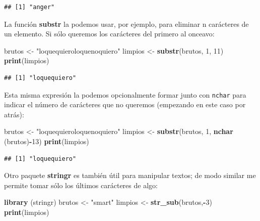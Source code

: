 \documentclass[]{book}
\newenvironment{Shaded}{\begin{snugshade}}{\end{snugshade}}
\newcommand{\DecValTok}[1]{\textcolor[rgb]{0.00,0.00,0.81}{#1}}
\newcommand{\KeywordTok}[1]{\textcolor[rgb]{0.13,0.29,0.53}{\textbf{#1}}}
\newcommand{\NormalTok}[1]{#1}
\newcommand{\OperatorTok}[1]{\textcolor[rgb]{0.81,0.36,0.00}{\textbf{#1}}}
\newcommand{\StringTok}[1]{\textcolor[rgb]{0.31,0.60,0.02}{#1}}
\theoremstyle{definition}
\theoremstyle{definition}
\theoremstyle{definition}
\theoremstyle{remark}
\begin{document}
\begin{verbatim}
## [1] "anger"
\end{verbatim}

La función \textbf{substr} la podemos usar, por ejemplo, para eliminar n
carácteres de un elemento. Si sólo queremos los carácteres del primero
al onceavo:

\begin{Shaded}
\begin{Highlighting}[]
\NormalTok{brutos <-}\StringTok{ "loquequieroloquenoquiero"}
\NormalTok{limpios <-}\StringTok{ }\KeywordTok{substr}\NormalTok{(brutos, }\DecValTok{1}\NormalTok{, }\DecValTok{11}\NormalTok{)}
\KeywordTok{print}\NormalTok{(limpios)}
\end{Highlighting}
\end{Shaded}

\begin{verbatim}
## [1] "loquequiero"
\end{verbatim}

Esta misma expresión la podemos opcionalmente formar junto con
\texttt{nchar} para indicar el número de carácteres que no queremos
(empezando en este caso por atrás):

\begin{Shaded}
\begin{Highlighting}[]
\NormalTok{brutos <-}\StringTok{ "loquequieroloquenoquiero"}
\NormalTok{limpios <-}\StringTok{ }\KeywordTok{substr}\NormalTok{(brutos, }\DecValTok{1}\NormalTok{, }\KeywordTok{nchar}\NormalTok{ (brutos)}\OperatorTok{-}\DecValTok{13}\NormalTok{)}
\KeywordTok{print}\NormalTok{(limpios)}
\end{Highlighting}
\end{Shaded}

\begin{verbatim}
## [1] "loquequiero"
\end{verbatim}

Otro paquete \textbf{stringr} \citep{R-stringr} es también útil para
manipular textos; de modo similar me permite tomar sólo los últimos
carácteres de algo:

\begin{Shaded}
\begin{Highlighting}[]
\KeywordTok{library}\NormalTok{ (stringr)}
\NormalTok{brutos <-}\StringTok{ "smart"}
\NormalTok{limpios <-}\StringTok{ }\KeywordTok{str_sub}\NormalTok{(brutos,}\OperatorTok{-}\DecValTok{3}\NormalTok{)}
\KeywordTok{print}\NormalTok{(limpios)}
\end{Highlighting}
\end{Shaded}
\end{document}
